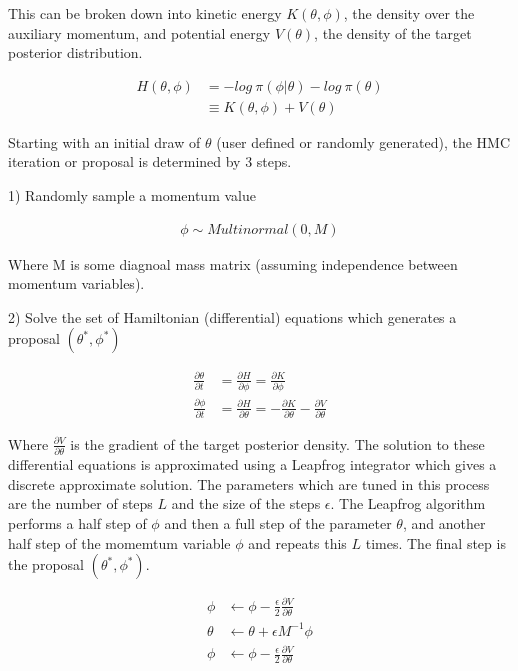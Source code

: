\documentclass[12pt, a4paper]{article}
\begin{document}
        This can be broken down into kinetic energy $K(\theta, \phi)$, the density over the auxiliary momentum, and potential energy $V(\theta)$, the density of the target posterior distribution.

        $$
        \begin{aligned}
        H(\theta, \phi) &= - log \: \pi(\phi | \theta) - log \: \pi(\theta) \\ 
        &\equiv  K(\theta, \phi) + V(\theta)
        \end{aligned}
        $$

         Starting with an initial draw of $\theta$ (user defined or randomly generated), the HMC iteration or proposal is determined by 3 steps.

        1) Randomly sample a momentum value

        $$
        \begin{aligned}
        \phi\sim Multinormal(0, M)
        \end{aligned}
        $$

        Where M is some diagnoal mass matrix (assuming independence between momentum variables).

        2) Solve the set of Hamiltonian (differential) equations which generates a proposal $(\theta^{\ast}, \phi^{\ast})$

        $$
        \begin{aligned}
        \frac{\partial \theta}{\partial t} &= \frac{\partial H}{\partial \phi} = \frac{\partial K}{\partial \phi} \\
        \frac{\partial \phi}{\partial t} &= \frac{\partial H}{\partial \theta} = - \frac{\partial K}{\partial \theta} - \frac{\partial V}        {\partial \theta}
        \end{aligned}
        $$

        Where $\frac{\partial V}{\partial \theta}$ is the gradient of the target posterior density. The solution to these differential equations is approximated using a Leapfrog integrator which gives a discrete approximate solution. The parameters which are tuned in this process are the number of steps $L$ and the size of the steps $\epsilon$. The Leapfrog algorithm performs a half step of $\phi$ and then a full step of the parameter $\theta$, and another half step of the momemtum variable $\phi$ and repeats this $L$ times. The final step is the proposal $(\theta^{\ast}, \phi^{\ast})$.

        $$
        \begin{aligned}
        \phi &\leftarrow \phi - \frac{\epsilon}{2} \frac{\partial V}{\partial \theta} \\
        \theta &\leftarrow \theta + \epsilon M^{-1} \phi \\
        \phi &\leftarrow \phi - \frac{\epsilon}{2} \frac{\partial V}{\partial \theta}
        \end{aligned}
        $$
\end{document}

